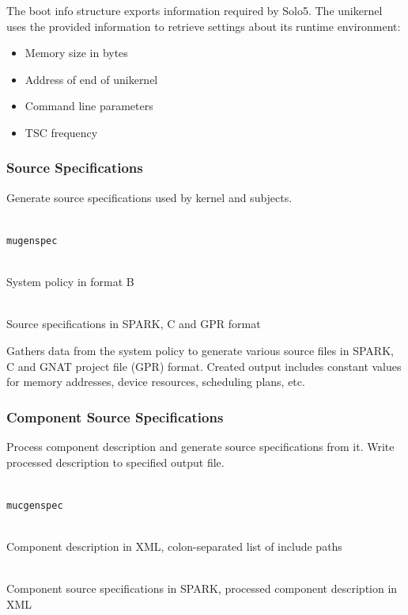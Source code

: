 \documentclass[a4paper,twoside,titlepage]{article}
\begin{document}
The boot info structure exports information required by Solo5. The
unikernel uses the provided information to retrieve settings about its runtime
environment:
\begin{itemize}
	\item Memory size in bytes
	\item Address of end of unikernel
	\item Command line parameters
	\item TSC frequency
\end{itemize}

\subsubsection{Source Specifications}
\label{sec:tools-gen-spec}
Generate source specifications used by kernel and subjects.

\begin{description} \itemsep1pt \parskip0pt
	\item[Name] \hfill \\
		\texttt{mugenspec}
	\item[Input] \hfill \\
		System policy in format B
	\item[Output] \hfill \\
		Source specifications in SPARK, C and GPR format
\end{description}

Gathers data from the system policy to generate various source files in SPARK,
C and GNAT project file (GPR) format. Created output includes constant values
for memory addresses, device resources, scheduling plans, etc.

\subsubsection{Component Source Specifications}
\label{sec:tools-cgen-spec}
Process component description and generate source specifications from it. Write
processed description to specified output file.

\begin{description} \itemsep1pt \parskip0pt
	\item[Name] \hfill \\
		\texttt{mucgenspec}
	\item[Input] \hfill \\
		Component description in XML, colon-separated list of include paths
	\item[Output] \hfill \\
		Component source specifications in SPARK, processed component
		description in XML
\end{description}
\end{document}
